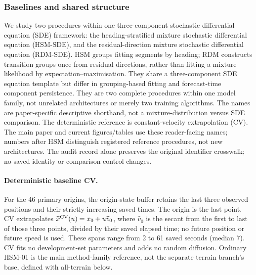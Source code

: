 \subsubsection{Baselines and shared structure}
We study two procedures within one three-component stochastic differential
equation (SDE) framework: the heading-stratified mixture stochastic differential
equation (HSM-SDE), and the residual-direction mixture stochastic differential
equation (RDM-SDE). HSM groups fitting segments by heading; RDM constructs
transition groups once from residual directions, rather than fitting a
mixture likelihood by expectation--maximisation. They share a three-component
SDE equation template but differ in grouping-based fitting and forecast-time
component persistence. They are two complete procedures within one model family,
not unrelated architectures or merely two training algorithms. The names are
paper-specific descriptive shorthand, not a mixture-distribution versus SDE comparison.
The deterministic reference is constant-velocity extrapolation (CV).
The main paper and current figures/tables use these reader-facing names;
numbers after HSM distinguish registered reference procedures, not new architectures.
The audit record alone preserves the original identifier crosswalk;
no saved identity or comparison control changes.

\paragraph{Deterministic baseline CV.}
For the 46 primary origins, the origin-state buffer retains the last three
observed positions and their strictly increasing saved times. The origin
is the last point. CV extrapolates
$\widehat x^{\rm CV}(u)=x_0+u\widehat v_0$, where $\widehat v_0$ is the secant
from the first to last of those three points, divided by their saved elapsed
time; no future position or future speed is used. These spans range from
2 to 61 saved seconds (median 7). CV fits no development-set parameters and
adds no random diffusion. Ordinary HSM-01 is the main method-family reference,
not the separate terrain branch's base, defined with all-terrain below.
